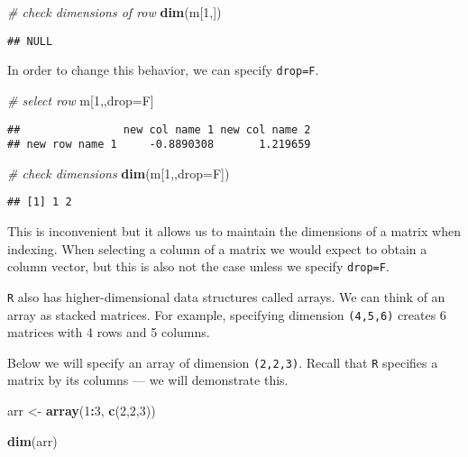 \documentclass[]{article}
\newenvironment{Shaded}{\begin{snugshade}}{\end{snugshade}}
\newcommand{\CommentTok}[1]{\textcolor[rgb]{0.56,0.35,0.01}{\textit{#1}}}
\newcommand{\DataTypeTok}[1]{\textcolor[rgb]{0.13,0.29,0.53}{#1}}
\newcommand{\DecValTok}[1]{\textcolor[rgb]{0.00,0.00,0.81}{#1}}
\newcommand{\KeywordTok}[1]{\textcolor[rgb]{0.13,0.29,0.53}{\textbf{#1}}}
\newcommand{\NormalTok}[1]{#1}
\newcommand{\OperatorTok}[1]{\textcolor[rgb]{0.81,0.36,0.00}{\textbf{#1}}}
\newcommand{\StringTok}[1]{\textcolor[rgb]{0.31,0.60,0.02}{#1}}
\begin{document}
\begin{Shaded}
\begin{Highlighting}[]
\CommentTok{# check dimensions of row}
\KeywordTok{dim}\NormalTok{(m[}\DecValTok{1}\NormalTok{,])}
\end{Highlighting}
\end{Shaded}

\begin{verbatim}
## NULL
\end{verbatim}

In order to change this behavior, we can specify \texttt{drop=F}.

\begin{Shaded}
\begin{Highlighting}[]
\CommentTok{# select row}
\NormalTok{m[}\DecValTok{1}\NormalTok{,,drop=F]}
\end{Highlighting}
\end{Shaded}

\begin{verbatim}
##                new col name 1 new col name 2
## new row name 1     -0.8890308       1.219659
\end{verbatim}

\begin{Shaded}
\begin{Highlighting}[]
\CommentTok{# check dimensions}
\KeywordTok{dim}\NormalTok{(m[}\DecValTok{1}\NormalTok{,,}\DataTypeTok{drop=}\NormalTok{F])}
\end{Highlighting}
\end{Shaded}

\begin{verbatim}
## [1] 1 2
\end{verbatim}

This is inconvenient but it allows us to maintain the dimensions of a
matrix when indexing. When selecting a column of a matrix we would
expect to obtain a column vector, but this is also not the case unless
we specify \texttt{drop=F}.

\texttt{R} also has higher-dimensional data structures called arrays. We
can think of an array as stacked matrices. For example, specifying
dimension \texttt{(4,5,6)} creates 6 matrices with 4 rows and 5 columns.

Below we will specify an array of dimension \texttt{(2,2,3)}. Recall
that \texttt{R} specifies a matrix by its columns --- we will
demonstrate this.

\begin{Shaded}
\begin{Highlighting}[]
\NormalTok{arr <-}\StringTok{ }\KeywordTok{array}\NormalTok{(}\DecValTok{1}\OperatorTok{:}\DecValTok{3}\NormalTok{, }\KeywordTok{c}\NormalTok{(}\DecValTok{2}\NormalTok{,}\DecValTok{2}\NormalTok{,}\DecValTok{3}\NormalTok{))}

\KeywordTok{dim}\NormalTok{(arr)}
\end{Highlighting}
\end{Shaded}
\end{document}

